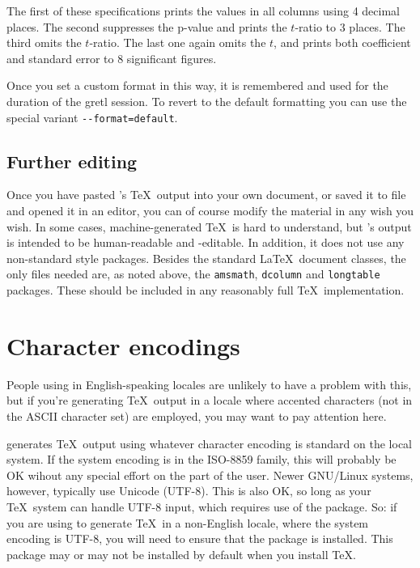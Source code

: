 The first of these specifications prints the values in all columns
using 4 decimal places.  The second suppresses the p-value and prints
the $t$-ratio to 3 places.  The third omits the $t$-ratio.  The last
one again omits the $t$, and prints both coefficient and standard
error to 8 significant figures.

Once you set a custom format in this way, it is remembered and used
for the duration of the gretl session.  To revert to the default
formatting you can use the special variant \verb|--format=default|.


\subsection{Further editing}

Once you have pasted 's \TeX\ output into your own
document, or saved it to file and opened it in an editor, you can of
course modify the material in any wish you wish.  In some cases,
machine-generated \TeX\ is hard to understand, but 's
output is intended to be human-readable and -editable.  In addition,
it does not use any non-standard style packages.  Besides the standard
\LaTeX\ document classes, the only files needed are, as noted above,
the \verb+amsmath+, \verb+dcolumn+ and \verb+longtable+ packages.
These should be included in any reasonably full \TeX\ implementation.


\section{Character encodings}
\label{tex-encode}

People using  in English-speaking locales are unlikely to
have a problem with this, but if you're generating \TeX\ output in a
locale where accented characters (not in the ASCII character set) are
employed, you may want to pay attention here.

 generates \TeX\ output using whatever character encoding
is standard on the local system.  If the system encoding is in the
ISO-8859 family, this will probably be OK wihout any special effort on
the part of the user.  Newer GNU/Linux systems, however, typically use
Unicode (UTF-8).  This is also OK, so long as your \TeX\ system can
handle UTF-8 input, which requires use of the  package.
So: if you are using  to generate \TeX\ in a non-English
locale, where the system encoding is UTF-8, you will need to ensure
that the  package is installed.  This package may or
may not be installed by default when you install \TeX{}.

